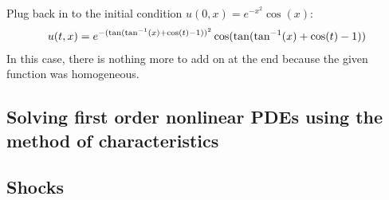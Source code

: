 \documentclass{article}
\newcommand{\bea}{\begin{eqnarray*}}
\newcommand{\eea}{\end{eqnarray*}}
\newcommand{\red}[1]{\textcolor{red}{#1}}
\newcommand{\blue}[1]{\textcolor{blue}{#1}}
\begin{document}
Plug back in to the initial condition $u(0,x) = e^{-x^2}\cos(x)$:
\bea
u(t,x) = e^{-(\tan(\tan^{-1}(x) + \cos(t) - 1))^2}\cos(\tan(\tan^{-1}(x) + \cos(t) - 1))\newline
\eea
In this case, there is nothing more to add on at the end because the given function was homogeneous.




\subsection{Solving first order nonlinear PDEs using the method of characteristics}



\subsection{Shocks}
\end{document}
